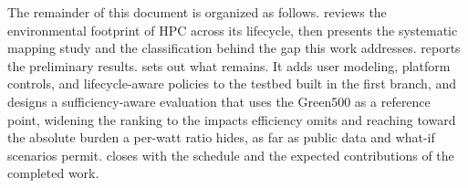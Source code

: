The remainder of this document is organized as follows.  reviews the environmental footprint of HPC across its lifecycle, then presents the systematic mapping study and the classification behind the gap this work addresses.  reports the preliminary results.  sets out what remains. It adds user modeling, platform controls, and lifecycle-aware policies to the testbed built in the first branch, and designs a sufficiency-aware evaluation that uses the Green500 as a reference point, widening the ranking to the impacts efficiency omits and reaching toward the absolute burden a per-watt ratio hides, as far as public data and what-if scenarios permit.  closes with the schedule and the expected contributions of the completed work.
